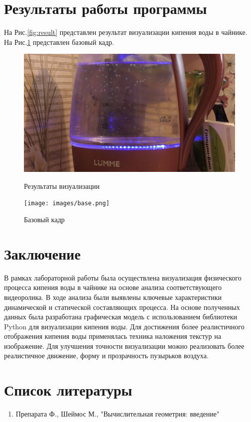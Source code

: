 \documentclass[areasetadvanced]{scrartcl}
\begin{document}
\section{Результаты работы программы}
На Рис.\ref{fig:result} представлен результат визуализации кипения воды в чайнике.
На Рис.\ref{fig:base} представлен базовый кадр.
\begin{figure}[H]
    \centering
    \begin{minipage}{0.48\textwidth}
        \centering
        \includegraphics[width=\linewidth]{images/result.png}
        \caption{Результаты визуализации}
        \label{fig:result}
    \end{minipage}\hfill
    \begin{minipage}{0.48\textwidth}
        \centering
        \texttt{[image: images/base.png]}
        \caption{Базовый кадр}
        \label{fig:base}
    \end{minipage}
\end{figure}

\newpage
\section*{Заключение}
В рамках лабораторной работы была осуществлена визуализация физического процесса кипения воды в чайнике на основе анализа соответствующего видеоролика.
В ходе анализа были выявлены ключевые характеристики динамической и статической составляющих процесса. 
На основе полученных данных была разработана графическая модель с использованием библиотеки Python для визуализации кипения воды.
Для достижения более реалистичного отображения кипения воды применялась техника наложения текстур на изображение. 
Для улучшения точности визуализации можно реализовать более реалистичное движение, форму и прозрачность пузырьков воздуха.
\newpage
\section*{Список литературы}
\begin{enumerate}
    \item Препарата Ф., Шеймос М., "Вычислительная геометрия: введение"
\end{enumerate}
\end{document}
